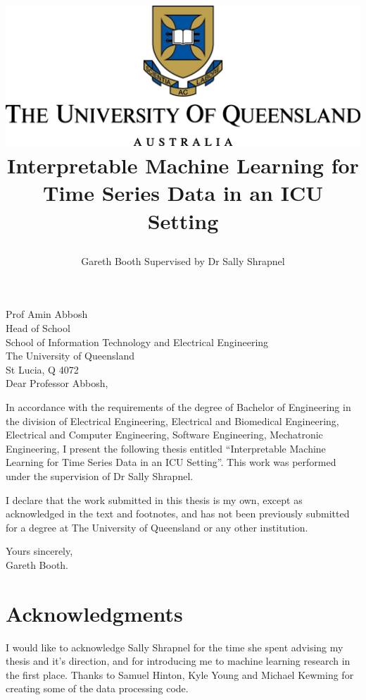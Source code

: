 \documentclass[12pt]{article}
\title{\parbox{\linewidth}{\vspace{-7ex}\centering%
  \includegraphics{PNGLogo.png}\vspace{5ex}\endgraf\bigskip\bigskip
  Interpretable Machine Learning for Time Series Data in an ICU Setting}}
\author{\parbox{\linewidth}{\centering%
  Gareth Booth\endgraf\bigskip\bigskip
  Supervised by Dr Sally Shrapnel}}
\date{\parbox{\linewidth}{\centering%
  Submitted for the degree of Bachelor of Engineering (Honours) for the School of ITEE\endgraf\bigskip\bigskip\today
  }}
\begin{document}
\maketitle
\newpage

\begin{flushright}
\end{flushright}
\begin{flushleft}
  Prof Amin Abbosh \\
  Head of School\\
  School of Information Technology and Electrical Engineering\\
  The University of Queensland\\
  St Lucia, Q 4072\\
  \bigskip\bigskip
  Dear Professor Abbosh,
\end{flushleft}

In accordance with the requirements of the degree of Bachelor of
Engineering in the division of 
Electrical Engineering,
Electrical and Biomedical Engineering,
Electrical and Computer Engineering,
Software Engineering,
Mechatronic Engineering,
I present the
following thesis entitled ``Interpretable Machine Learning for Time Series Data in an ICU Setting''.  This work was performed under the supervision of
Dr Sally Shrapnel.

I declare that the work submitted in this thesis is my own, except as
acknowledged in the text and footnotes, and has not been previously
submitted for a degree at The University of Queensland or any other
institution.

\begin{flushright}
	Yours sincerely,\\
	\medskip
	Gareth Booth.
\end{flushright}

\newpage

\section*{Acknowledgments}

I would like to acknowledge Sally Shrapnel for the time she spent advising my thesis and it's direction, and for introducing me to machine learning research in the first place. Thanks to Samuel Hinton, Kyle Young and Michael Kewming for creating some of the data processing code. 
\end{document}
